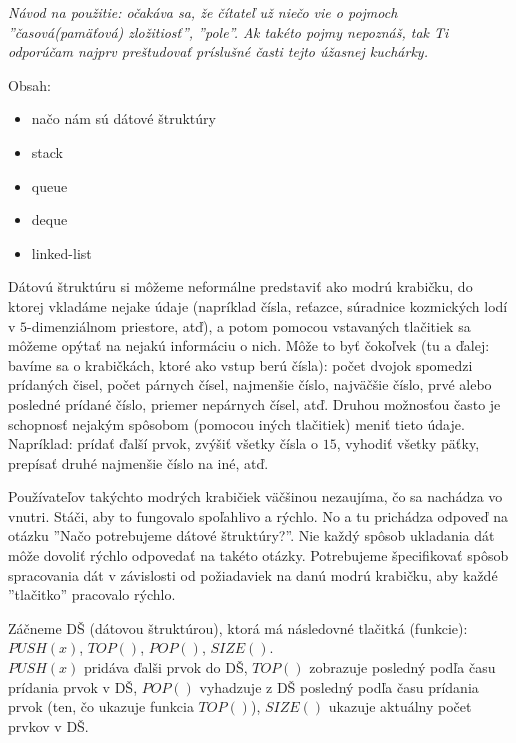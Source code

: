 



\textit{Návod na použitie: očakáva sa, že čítateľ už niečo vie o pojmoch 
''časová(pamäťová) zložitiosť'', ''pole''. Ak takéto
pojmy nepoznáš, tak Ti odporúčam najprv preštudovať príslušné časti tejto 
úžasnej kuchárky.}


Obsah:
\begin{itemize}
    \item načo nám sú dátové štruktúry
    \item stack    
    \item queue
    \item deque
    \item linked-list
\end{itemize}

\medskip

Dátovú štruktúru si môžeme neformálne predstaviť ako modrú krabičku, do ktorej 
vkladáme nejake údaje (napríklad čísla, reťazce, súradnice kozmických lodí v 
$5$-dimenziálnom priestore, atď), a potom pomocou vstavaných tlačitiek sa 
môžeme opýtať na nejakú informáciu o nich. Môže to byť čokoľvek (tu a ďalej: 
bavíme sa o krabičkách, ktoré ako vstup berú čísla): počet dvojok spomedzi 
prídaných čisel, počet párnych čísel, najmenšie číslo, najväčšie číslo, prvé 
alebo posledné prídané číslo, priemer nepárnych čísel, atď.
Druhou možnosťou často je schopnosť nejakým spôsobom (pomocou iných tlačitiek) 
meniť tieto údaje. Napríklad: prídať ďalší prvok, zvýšiť všetky čísla o $15$, 
vyhodiť všetky päťky, prepísať druhé najmenšie číslo na iné, atď. 

Používateľov takýchto modrých krabičiek väčšinou nezaujíma, čo sa nachádza vo 
vnutri. Stáči, aby to fungovalo spoľahlivo a rýchlo. No a tu prichádza odpoveď na 
otázku ''Načo potrebujeme dátové štruktúry?''. Nie každý spôsob ukladania dát 
môže dovoliť rýchlo odpovedať na takéto otázky. Potrebujeme špecifikovať spôsob 
spracovania dát v závislosti od požiadaviek na danú modrú krabičku, aby každé 
''tlačitko'' pracovalo rýchlo.


Záčneme DŠ (dátovou štruktúrou), ktorá má následovné tlačitká (funkcie): 
$PUSH(x)$, $TOP()$, $POP()$, $SIZE()$. \\
$PUSH(x)$ pridáva ďalši prvok do DŠ, $TOP()$ zobrazuje posledný podľa času 
prídania prvok v DŠ, $POP()$ vyhadzuje z DŠ posledný podľa času prídania prvok 
(ten, čo ukazuje funkcia $TOP()$), $SIZE()$ ukazuje aktuálny počet prvkov v DŠ.

